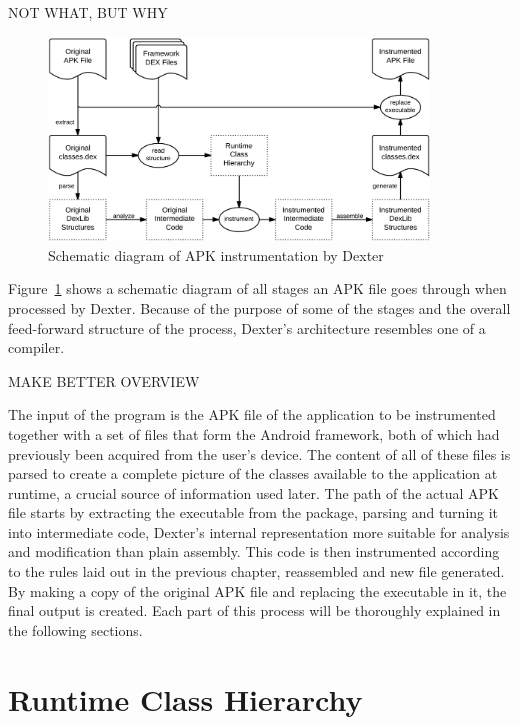 \documentclass[12pt,twoside,notitlepage]{report}
\begin{document}
NOT WHAT, BUT WHY

\begin{figure}
	\centerline{	
		\includegraphics[width=0.9\textwidth]{figs/fig_implementation_overview.png}
	}
	\caption{Schematic diagram of APK instrumentation by Dexter}
	\label{fig:Implementation_Overview}
\end{figure}

Figure~\ref{fig:Implementation_Overview} shows a schematic diagram of all stages an APK file goes through when processed by Dexter. Because of the purpose of some of the stages and the overall feed-forward structure of the process, Dexter's architecture resembles one of a compiler.

MAKE BETTER OVERVIEW

The input of the program is the APK file of the application to be instrumented together with a set of files that form the Android framework, both of which had previously been acquired from the user's device. The content of all of these files is parsed to create a complete picture of the classes available to the application at runtime, a crucial source of information used later. The path of the actual APK file starts by extracting the executable from the package, parsing and turning it into intermediate code, Dexter's internal representation more suitable for analysis and modification than plain assembly. This code is then instrumented according to the rules laid out in the previous chapter, reassembled and new file generated. By making a copy of the original APK file and replacing the executable in it, the final output is created. Each part of this process will be thoroughly explained in the following sections.

\section{Runtime Class Hierarchy}
\end{document}
